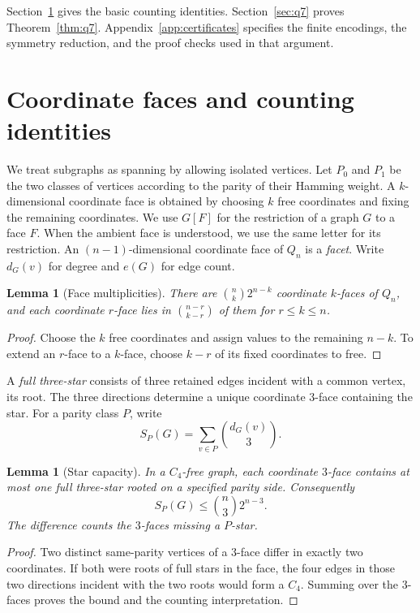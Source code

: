 \documentclass[11pt,reqno]{amsart}
\numberwithin{equation}{section}
\newtheorem{lemma}[theorem]{Lemma}
\begin{document}
Section~\ref{sec:prelims} gives the basic counting identities.
Section~\ref{sec:q7} proves Theorem~\ref{thm:q7}.
Appendix~\ref{app:certificates} specifies the finite encodings, the
symmetry reduction, and the proof checks used in that argument.

\section{Coordinate faces and counting identities}\label{sec:prelims}

We treat subgraphs as spanning by allowing isolated vertices. Let
\(P_0\) and \(P_1\) be the two classes of vertices according to the parity
of their Hamming weight. A \(k\)-dimensional coordinate face is obtained
by choosing \(k\) free coordinates and fixing the remaining coordinates.
We use \(G[F]\) for the restriction of a graph \(G\) to a face \(F\).
When the ambient face is understood, we use the same letter for its
restriction. An \((n-1)\)-dimensional coordinate face of \(Q_n\) is a
\emph{facet}. Write \(d_G(v)\) for degree and \(e(G)\) for edge count.

\begin{lemma}[Face multiplicities]\label{lem:multiplicities}
There are \(\binom nk 2^{n-k}\) coordinate \(k\)-faces of \(Q_n\), and
each coordinate \(r\)-face lies in \(\binom{n-r}{k-r}\) of them for
\(r\le k\le n\).
\end{lemma}

\begin{proof}
Choose the \(k\) free coordinates and assign values to the remaining
\(n-k\). To extend an \(r\)-face to a \(k\)-face, choose \(k-r\) of
its fixed coordinates to free.
\end{proof}

A \emph{full three-star} consists of three retained edges incident
with a common vertex, its root. The three directions determine a
unique coordinate \(3\)-face containing the star. For a parity class
\(P\), write
\[
  S_P(G)=\sum_{v\in P}\binom{d_G(v)}{3}.
\]

\begin{lemma}[Star capacity]\label{lem:star}
In a \(C_4\)-free graph, each coordinate \(3\)-face contains at most
one full three-star rooted on a specified parity side. Consequently
\[
  S_P(G)\le \binom{n}{3}2^{n-3}.
\]
The difference counts the \(3\)-faces \emph{missing a \(P\)-star}.
\end{lemma}

\begin{proof}
Two distinct same-parity vertices of a \(3\)-face differ in exactly
two coordinates. If both were roots of full stars in the face, the four
edges in those two directions incident with the two roots would form a
\(C_4\). Summing over the \(3\)-faces proves the bound and the counting
interpretation.
\end{proof}
\end{document}
